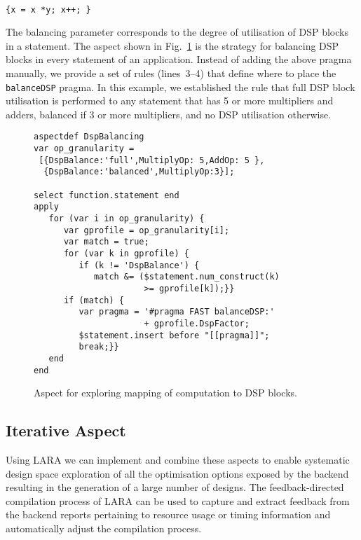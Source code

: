 \noindent\texttt{\footnotesize{} \\
\{x = x *y; x++; \}}

\vspace{2mm} The balancing parameter corresponds to the degree of
utilisation of DSP blocks in a statement.  The aspect shown in
Fig.~\ref{fig:aspect-DSP} is the strategy for balancing DSP blocks in
every statement of an application. Instead of adding the above pragma
manually, we provide a set of rules (lines~3--4) that define where to
place the \texttt{balanceDSP} pragma. In this example, we established the rule
that full DSP block utilisation is performed to any statement that has
5 or more multipliers and adders, balanced if 3 or more multipliers,
and no DSP utilisation otherwise.

\lstset{style=lara}
\begin{figure}[!h]
  \centering
  \begin{lstlisting}
aspectdef DspBalancing
var op_granularity =
 [{DspBalance:'full',MultiplyOp: 5,AddOp: 5 },
  {DspBalance:'balanced',MultiplyOp:3}];

select function.statement end
apply
   for (var i in op_granularity) {
      var gprofile = op_granularity[i];
      var match = true;
      for (var k in gprofile) {
         if (k != 'DspBalance') {
            match &= ($statement.num_construct(k)
                      >= gprofile[k]);}}
      if (match) {
         var pragma = '#pragma FAST balanceDSP:'
                      + gprofile.DspFactor;
         $statement.insert before "[[pragma]]";
         break;}}
   end
end
  \end{lstlisting}
  \caption{Aspect for exploring mapping of computation to DSP blocks.}
  \label{fig:aspect-DSP}
\vspace{-3mm}
\end{figure}

\subsection{Iterative Aspect}
\label{sect:asp_it}
Using LARA we can implement and combine these aspects to enable
systematic design space exploration of all the optimisation options
exposed by the \MAXC{} backend resulting in the generation of a large
number of designs. The feedback-directed compilation process of LARA
can be used to capture and extract feedback from the backend reports
pertaining to resource usage or timing information and automatically
adjust the compilation process.

